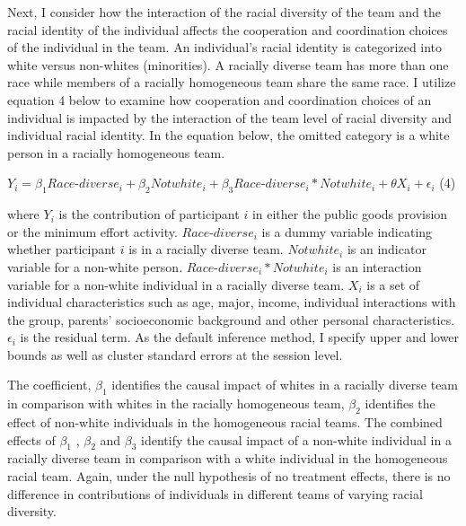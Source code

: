\hspace  *{0mm} Next, I consider how the interaction of the racial diversity of the team and the racial identity of the individual affects the cooperation and coordination choices of the individual in the team. An individual's racial identity is categorized into white versus non-whites (minorities). A racially diverse team has more than one race while members of a racially homogeneous team share the same race. I utilize equation 4 below to examine how cooperation and coordination choices of an individual is impacted by the interaction of the team level of racial diversity and individual racial identity. In the equation below, the omitted category is a white person in a racially homogeneous team.

\begin{center}
 $ Y_{i} = \beta_1 Race$-$diverse_{i} + \beta_2 Notwhite_{i} + \beta_3 Race$-$diverse_{i}*Notwhite_{i} + \theta X_{i} + \epsilon_{i}  $    (4)
\end{center}

\noindent where $Y_{i}$ is the contribution of participant $i$ in either the public goods provision or the minimum effort activity. $Race$-$diverse_{i}$ is a dummy variable indicating whether participant $i$ is in a racially diverse team. $Notwhite_{i}$ is an indicator variable for a non-white person. $Race$-$diverse_{i}*Notwhite_{i}$ is an interaction variable for a non-white individual in a racially diverse team. $X_{i}$ is a set of individual characteristics such as age, major, income, individual interactions with the group, parents' socioeconomic background and other personal characteristics. $\epsilon_{i}$ is the residual term. As the default inference method, I specify upper and lower bounds as well as cluster standard errors at the session level.

The coefficient, $\beta_1$ identifies the causal impact of whites in a racially diverse team in comparison with whites in the racially homogeneous team, $\beta_2$ identifies the effect of non-white individuals in the homogeneous racial teams. The combined effects of $\beta_1$ , $\beta_2$ and $\beta_3$ identify the causal impact of a non-white individual in a racially diverse team in comparison with a white individual in the homogeneous racial team. Again, under the null hypothesis of no treatment effects, there is no difference in contributions of individuals in different teams of varying racial diversity. 

